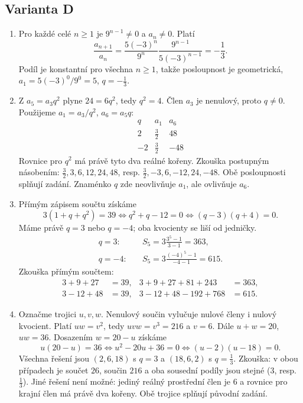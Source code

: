 \documentclass[a4paper,10pt]{article}
\begin{document}
\newpage
\subsection*{Varianta D}
\begin{enumerate}
\item Pro každé celé $n\geq1$ je $9^{n-1}\ne0$ a $a_n\ne0$. Platí
\[
\frac{a_{n+1}}{a_n}
=\frac{5(-3)^n}{9^n}\frac{9^{n-1}}{5(-3)^{n-1}}
=-\frac13.
\]
Podíl je konstantní pro všechna $n\geq1$, takže posloupnost je geometrická,
$a_1=5(-3)^0/9^0=5$, $q=-\frac13$.

\item Z $a_5=a_3q^2$ plyne $24=6q^2$, tedy $q^2=4$.
Člen $a_3$ je nenulový, proto $q\ne0$. Použijeme
$a_1=a_3/q^2$, $a_6=a_5q$:
\[
\begin{array}{c|c|c}
q&a_1&a_6\\ \hline
2&\frac32&48\\
-2&\frac32&-48
\end{array}
\]
Rovnice pro $q^2$ má právě tyto dva reálné kořeny.
Zkouška postupným násobením: $\frac32,3,6,12,24,48$,
resp. $\frac32,-3,6,-12,24,-48$. Obě posloupnosti splňují zadání.
Znaménko $q$ zde neovlivňuje $a_1$, ale ovlivňuje $a_6$.

\item Přímým zápisem součtu získáme
\[
3(1+q+q^2)=39
\iff q^2+q-12=0
\iff(q-3)(q+4)=0.
\]
Máme právě $q=3$ nebo $q=-4$; oba kvocienty se liší od jedničky.
\[
\begin{aligned}
q=3:&\quad S_5=3\frac{3^5-1}{3-1}=363,\\
q=-4:&\quad S_5=3\frac{(-4)^5-1}{-4-1}=615.
\end{aligned}
\]
Zkouška přímým součtem:
\[
\begin{aligned}
3+9+27&=39,&3+9+27+81+243&=363,\\
3-12+48&=39,&3-12+48-192+768&=615.
\end{aligned}
\]

\item Označme trojici $u,v,w$. Nenulový součin vylučuje nulové členy
i nulový kvocient. Platí $uw=v^2$, tedy $uvw=v^3=216$ a $v=6$.
Dále $u+w=20$, $uw=36$. Dosazením $w=20-u$ získáme
\[
u(20-u)=36\iff u^2-20u+36=0\iff(u-2)(u-18)=0.
\]
Všechna řešení jsou $(2,6,18)$ s $q=3$ a $(18,6,2)$ s $q=\frac13$.
Zkouška: v obou případech je součet $26$, součin $216$ a oba sousední
podíly jsou stejné ($3$, resp. $\frac13$).
Jiné řešení není možné: jediný reálný prostřední člen je $6$ a rovnice
pro krajní člen má právě dva kořeny. Obě trojice splňují původní zadání.
\end{enumerate}
\end{document}
